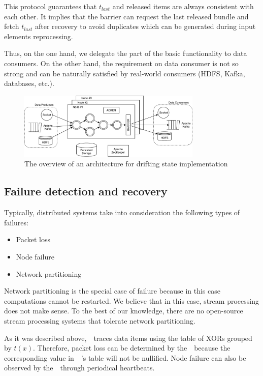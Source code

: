 This protocol guarantees that $t_{last}$ and released items are always consistent with each other. It implies that the barrier can request the last released bundle and fetch $t_{last}$ after recovery to avoid duplicates which can be generated during input elements reprocessing.

Thus, on the one hand, we delegate the part of the basic functionality to data consumers. On the other hand, the requirement on data consumer is not so strong and can be naturally satisfied by real-world consumers (HDFS, Kafka, databases, etc.). 

\begin{figure}[tbp]
  \centering
  \includegraphics[width=0.78\textwidth]{pics/arch}
  \caption{The overview of an architecture for drifting state implementation}
  \label {arch}
\end{figure}

\subsection{Failure detection and recovery}

Typically, distributed systems take into consideration the following types of failures:
\begin{itemize}
    \item Packet loss
    \item Node failure
    \item Network partitioning
\end{itemize}

Network partitioning is the special case of failure because in this case computations cannot be restarted. We believe that in this case, stream processing does not make sense. To the best of our knowledge, there are no open-source stream processing systems that tolerate network partitioning.

As it was described above,~\Acker\ traces data items using the table of XORs grouped by $t(x)$. Therefore, packet loss can be determined by the~\Acker\ because the corresponding value in~\Acker\ 's table will not be nullified. Node failure can also be observed by the~\Acker\ through periodical heartbeats. 

